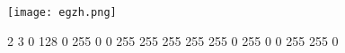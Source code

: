 \begin{center}
    \texttt{[image: egzh.png]}
\end{center}
\Example

\begin{example}%
{
2 3
0 128 0
255 0 0
255 255 255
255 255 0
255 0 0
255 255 0
}%

\end{example}